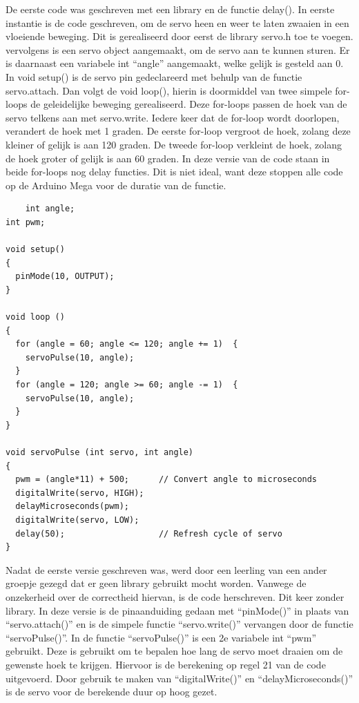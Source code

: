 De eerste code was geschreven met een library en de functie delay(). In eerste instantie is de code geschreven, om de servo heen en weer te laten zwaaien in een vloeiende beweging. Dit is gerealiseerd door eerst de library servo.h toe te voegen. vervolgens is een servo object aangemaakt, om de servo aan te kunnen sturen. Er is daarnaast een variabele int “angle” aangemaakt, welke gelijk is gesteld aan 0.  In void setup() is de servo pin gedeclareerd met behulp van de functie servo.attach. 
Dan volgt de void loop(), hierin is doormiddel van twee simpele for-loops de geleidelijke beweging gerealiseerd. Deze for-loops passen de hoek van de servo telkens aan met servo.write. Iedere keer dat de for-loop wordt doorlopen, verandert de hoek met 1 graden. De eerste for-loop vergroot de hoek, zolang deze kleiner of gelijk is aan 120 graden. De tweede for-loop verkleint de hoek, zolang de hoek groter of gelijk is aan 60 graden. In deze versie van de code staan in beide for-loops nog delay functies. Dit is niet ideal, want deze stoppen alle code op de \gls{Arduino Mega}\cite{ArduinoMEGA} voor de duratie van de functie. 

\begin{lstlisting}
    int angle;
int pwm;

void setup()
{
  pinMode(10, OUTPUT);
}

void loop ()
{
  for (angle = 60; angle <= 120; angle += 1)  {
    servoPulse(10, angle);  
  }
  for (angle = 120; angle >= 60; angle -= 1)  {
    servoPulse(10, angle); 
  }
}
  
void servoPulse (int servo, int angle)
{
  pwm = (angle*11) + 500;      // Convert angle to microseconds
  digitalWrite(servo, HIGH);
  delayMicroseconds(pwm);
  digitalWrite(servo, LOW);
  delay(50);                   // Refresh cycle of servo
}
\end{lstlisting}

Nadat de eerste versie geschreven was, werd door een leerling van een ander groepje gezegd dat er geen library gebruikt mocht worden. Vanwege de onzekerheid over de correctheid hiervan, is de code herschreven.  Dit keer zonder library\cite{Aansturen-servo-zonder-library}. In deze versie is de pinaanduiding gedaan met “pinMode()” in plaats van “servo.attach()” en is de simpele functie “servo.write()” vervangen door de functie “servoPulse()”. In de functie “servoPulse()” is een 2e variabele int “pwm” gebruikt. Deze is gebruikt om te bepalen hoe lang de servo moet draaien om de gewenste hoek te krijgen. Hiervoor is de berekening op regel 21 van de code uitgevoerd. Door gebruik te maken van “digitalWrite()” en “delayMicroseconds()” is de servo voor de berekende duur op hoog gezet. 

